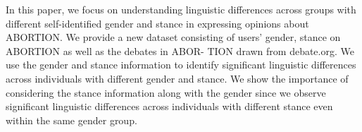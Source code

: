 In this paper, we focus on understanding linguistic differences across groups with different self-identified gender and stance in expressing opinions about ABORTION. We provide a new dataset consisting of users' gender, stance on ABORTION as well as the debates in ABOR- TION drawn from debate.org. We use the gender and stance information to identify significant linguistic differences across individuals with different gender and stance. We show the importance of considering the stance information along with the gender since we observe significant linguistic differences across individuals with different stance even within the same gender group.
